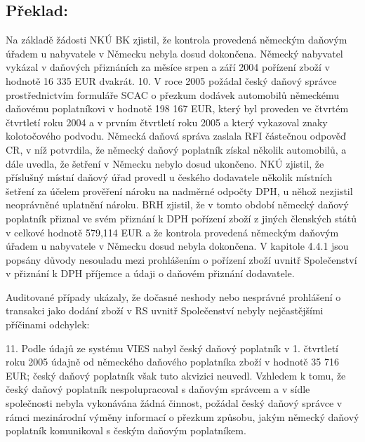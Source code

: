 \documentclass[10pt]{article}
\begin{document}
\subsection*{Překlad:}

Na základě žádosti NKÚ BK zjistil, že kontrola provedená německým daňovým úřadem u nabyvatele v Německu nebyla dosud dokončena.
Německý nabyvatel vykázal v daňových přiznáních za měsíce srpen a září 2004 pořízení zboží v hodnotě 16 335 EUR dvakrát.
10.
V roce 2005 požádal český daňový správce prostřednictvím formuláře SCAC o přezkum dodávek automobilů německému daňovému poplatníkovi v hodnotě 198 167 EUR, který byl proveden ve čtvrtém čtvrtletí roku 2004 a v prvním čtvrtletí roku 2005 a který vykazoval znaky kolotočového podvodu.
Německá daňová správa zaslala RFI částečnou odpověď CR, v níž potvrdila, že německý daňový poplatník získal několik automobilů, a dále uvedla, že šetření v Německu nebylo dosud ukončeno.
NKÚ zjistil, že příslušný místní daňový úřad provedl u českého dodavatele několik místních šetření za účelem prověření nároku na nadměrné odpočty DPH, u něhož nezjistil neoprávněné uplatnění nároku.
BRH zjistil, že v tomto období německý daňový poplatník přiznal ve svém přiznání k DPH pořízení zboží z jiných členských států v celkové hodnotě 579,114 EUR a že kontrola provedená německým daňovým úřadem u nabyvatele v Německu dosud nebyla dokončena.
V kapitole 4.4.1 jsou popsány důvody nesouladu mezi prohlášením o pořízení zboží uvnitř Společenství v přiznání k DPH příjemce a údaji o daňovém přiznání dodavatele.


Auditované případy ukázaly, že dočasné neshody nebo nesprávné prohlášení o transakci jako dodání zboží v RS uvnitř Společenství nebyly nejčastějšími příčinami odchylek:

11.
Podle údajů ze systému VIES nabyl český daňový poplatník v 1. čtvrtletí roku 2005 údajně od německého daňového poplatníka zboží v hodnotě 35 716 EUR; český daňový poplatník však tuto akvizici neuvedl.
Vzhledem k tomu, že český daňový poplatník nespolupracoval s daňovým správcem a v sídle společnosti nebyla vykonávána žádná činnost, požádal český daňový správce v rámci mezinárodní výměny informací o přezkum způsobu, jakým německý daňový poplatník komunikoval s českým daňovým poplatníkem.
\end{document}
